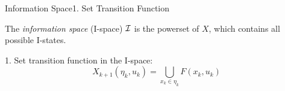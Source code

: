 \begin{frame}{Information Space}{1. Set Transition Function}
 \begin{definition}
  The \emph{information space} (I-space) $\mathcal{I}$ is the
  powerset of $X$, which contains all possible I-states.
  \end{definition}
  1. Set transition function in the I-space:
  \begin{equation}
    \label{eq:settrans}
    X_{k+1}(\eta_{k}, u_k) =  \bigcup_{x_k \in \eta_k} F(x_k, u_k)
  \end{equation}
 \begin{columns}
      \begin{column}{0.35\textwidth}
        \begin{figure}
          \centering
\end{figure}
\end{column}
\end{columns}
\end{frame}
